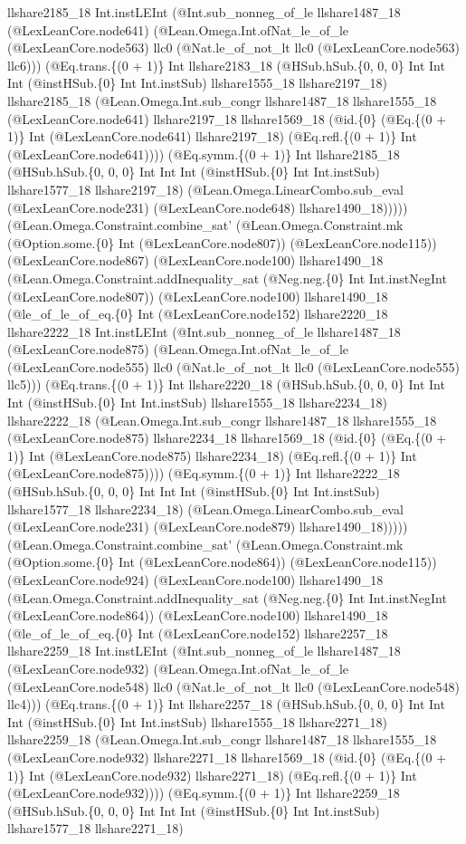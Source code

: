 \documentclass[11pt]{article}
\begin{document}
llshare2185\_18 Int.instLEInt (@Int.sub\_nonneg\_of\_le llshare1487\_18 (@LexLeanCore.node641) (@Lean.Omega.Int.ofNat\_le\_of\_le (@LexLeanCore.node563) llc0 (@Nat.le\_of\_not\_lt llc0 (@LexLeanCore.node563) llc6))) (@Eq.trans.\{(0 + 1)\} Int llshare2183\_18 (@HSub.hSub.\{0, 0, 0\} Int Int Int (@instHSub.\{0\} Int Int.instSub) llshare1555\_18 llshare2197\_18) llshare2185\_18 (@Lean.Omega.Int.sub\_congr llshare1487\_18 llshare1555\_18 (@LexLeanCore.node641) llshare2197\_18 llshare1569\_18 (@id.\{0\} (@Eq.\{(0 + 1)\} Int (@LexLeanCore.node641) llshare2197\_18) (@Eq.refl.\{(0 + 1)\} Int (@LexLeanCore.node641)))) (@Eq.symm.\{(0 + 1)\} Int llshare2185\_18 (@HSub.hSub.\{0, 0, 0\} Int Int Int (@instHSub.\{0\} Int Int.instSub) llshare1577\_18 llshare2197\_18) (@Lean.Omega.LinearCombo.sub\_eval (@LexLeanCore.node231) (@LexLeanCore.node648) llshare1490\_18))))) (@Lean.Omega.Constraint.combine\_sat' (@Lean.Omega.Constraint.mk (@Option.some.\{0\} Int (@LexLeanCore.node807)) (@LexLeanCore.node115)) (@LexLeanCore.node867) (@LexLeanCore.node100) llshare1490\_18 (@Lean.Omega.Constraint.addInequality\_sat (@Neg.neg.\{0\} Int Int.instNegInt (@LexLeanCore.node807)) (@LexLeanCore.node100) llshare1490\_18 (@le\_of\_le\_of\_eq.\{0\} Int (@LexLeanCore.node152) llshare2220\_18 llshare2222\_18 Int.instLEInt (@Int.sub\_nonneg\_of\_le llshare1487\_18 (@LexLeanCore.node875) (@Lean.Omega.Int.ofNat\_le\_of\_le (@LexLeanCore.node555) llc0 (@Nat.le\_of\_not\_lt llc0 (@LexLeanCore.node555) llc5))) (@Eq.trans.\{(0 + 1)\} Int llshare2220\_18 (@HSub.hSub.\{0, 0, 0\} Int Int Int (@instHSub.\{0\} Int Int.instSub) llshare1555\_18 llshare2234\_18) llshare2222\_18 (@Lean.Omega.Int.sub\_congr llshare1487\_18 llshare1555\_18 (@LexLeanCore.node875) llshare2234\_18 llshare1569\_18 (@id.\{0\} (@Eq.\{(0 + 1)\} Int (@LexLeanCore.node875) llshare2234\_18) (@Eq.refl.\{(0 + 1)\} Int (@LexLeanCore.node875)))) (@Eq.symm.\{(0 + 1)\} Int llshare2222\_18 (@HSub.hSub.\{0, 0, 0\} Int Int Int (@instHSub.\{0\} Int Int.instSub) llshare1577\_18 llshare2234\_18) (@Lean.Omega.LinearCombo.sub\_eval (@LexLeanCore.node231) (@LexLeanCore.node879) llshare1490\_18))))) (@Lean.Omega.Constraint.combine\_sat' (@Lean.Omega.Constraint.mk (@Option.some.\{0\} Int (@LexLeanCore.node864)) (@LexLeanCore.node115)) (@LexLeanCore.node924) (@LexLeanCore.node100) llshare1490\_18 (@Lean.Omega.Constraint.addInequality\_sat (@Neg.neg.\{0\} Int Int.instNegInt (@LexLeanCore.node864)) (@LexLeanCore.node100) llshare1490\_18 (@le\_of\_le\_of\_eq.\{0\} Int (@LexLeanCore.node152) llshare2257\_18 llshare2259\_18 Int.instLEInt (@Int.sub\_nonneg\_of\_le llshare1487\_18 (@LexLeanCore.node932) (@Lean.Omega.Int.ofNat\_le\_of\_le (@LexLeanCore.node548) llc0 (@Nat.le\_of\_not\_lt llc0 (@LexLeanCore.node548) llc4))) (@Eq.trans.\{(0 + 1)\} Int llshare2257\_18 (@HSub.hSub.\{0, 0, 0\} Int Int Int (@instHSub.\{0\} Int Int.instSub) llshare1555\_18 llshare2271\_18) llshare2259\_18 (@Lean.Omega.Int.sub\_congr llshare1487\_18 llshare1555\_18 (@LexLeanCore.node932) llshare2271\_18 llshare1569\_18 (@id.\{0\} (@Eq.\{(0 + 1)\} Int (@LexLeanCore.node932) llshare2271\_18) (@Eq.refl.\{(0 + 1)\} Int (@LexLeanCore.node932)))) (@Eq.symm.\{(0 + 1)\} Int llshare2259\_18 (@HSub.hSub.\{0, 0, 0\} Int Int Int (@instHSub.\{0\} Int Int.instSub) llshare1577\_18 llshare2271\_18) 
\end{document}
